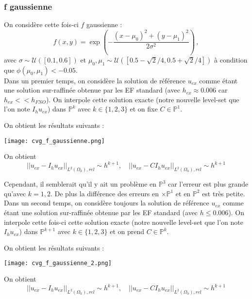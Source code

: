\subsubsection*{f gaussienne}

On considère cette fois-ci $f$ gaussienne :
$$f(x,y) = \exp\left(-\frac{(x-\mu_0)^2 + (y-\mu_1)^2}{2\sigma^2}\right)\,, $$ 
avec $\sigma \sim \mathcal{U}([0.1,0.6])$ et $\mu_0, \mu_1 \sim \mathcal{U}([0.5-\sqrt{2}/4, 0.5+\sqrt{2}/4])$ à condition que $\phi(\mu_0, \mu_1) < -0.05$. \\

Dans un premier temps, on considère la solution de référence $u_{ex}$ comme étant une solution sur-raffinée obtenue par les EF standard (avec $h_{ex}\approx 0.006$ car $h_{ex}<<h_{FNO}$).  On interpole cette solution exacte (notre nouvelle level-set que l'on note $I_h u_{ex}$) dans $\mathbb{P}^k$ avec $k\in\{1,2,3\}$ et on fixe $C\in\mathbb{P}^1$.  


On obtient les résultats suivants :

\begin{minipage}{\linewidth}
	\centering
	\texttt{[image: cvg\_f\_gaussienne.png]}
\end{minipage}

On obtient
$$||u_{ex}-I_h u_{ex}||_{L^2(\Omega_h),rel}\sim h^{k+1}, \quad ||u_{ex}-CI_h u_{ex}||_{L^2(\Omega_h),rel}\sim h^{k+1}$$

Cependant, il semblerait qu'il y ait un problème en $\mathbb{P}^3$ car l'erreur est plus grande qu'avec $k=1,2$. De plus la différence des erreurs en $×\mathbb{P}^1$ et en $\mathbb{P}^2$ est très petite. \\

Dans un second temps, on considère toujours la solution de référence $u_{ex}$ comme étant une solution sur-raffinée obtenue par les EF standard (avec $h\le 0.006$). On interpole cette fois-ci cette solution exacte (notre nouvelle level-set que l'on note $I_h u_{ex}$) dans $\mathbb{P}^{k+1}$ avec $k\in\{1,2,3\}$ et on prend $C\in\mathbb{P}^k$.  

On obtient les résultats suivants :

\begin{minipage}{\linewidth}
	\centering
	\texttt{[image: cvg\_f\_gaussienne\_2.png]}
\end{minipage}

On obtient
$$||u_{ex}-I_h u_{ex}||_{L^2(\Omega_h),rel}\sim h^{k+1}, \quad ||u_{ex}-CI_h u_{ex}||_{L^2(\Omega_h),rel}\sim h^{k+1}$$

